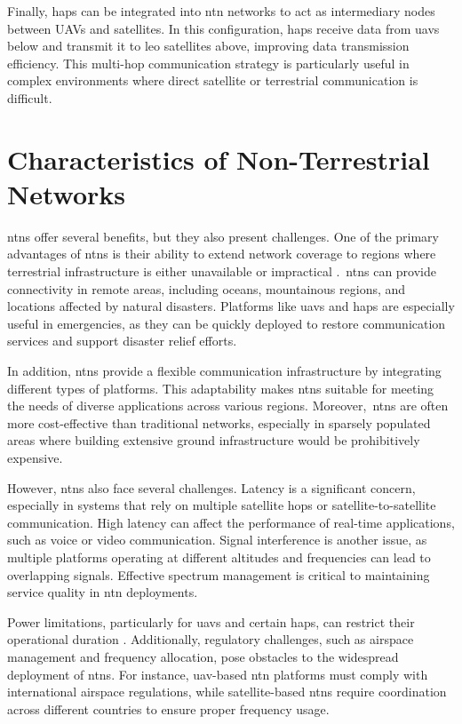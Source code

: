 Finally, \glspl{hap} can be integrated into \gls{ntn} networks to act as intermediary nodes between UAVs and satellites. In this configuration, \glspl{hap} receive data from \glspl{uav} below and transmit it to \gls{leo} satellites above, improving data transmission efficiency. This multi-hop communication strategy is particularly useful in complex environments where direct satellite or terrestrial communication is difficult.

\section{Characteristics of Non-Terrestrial Networks}\label{sec:characteristics_of_non_terrestrial_networks}

\glspl{ntn} offer several benefits, but they also present challenges. One of the primary advantages of \glspl{ntn} is their ability to extend network coverage to regions where terrestrial infrastructure is either unavailable or impractical \autocite{evolution_ntn_from_5g_6g_survey}.\ \glspl{ntn} can provide connectivity in remote areas, including oceans, mountainous regions, and locations affected by natural disasters. Platforms like \glspl{uav} and \glspl{hap} are especially useful in emergencies, as they can be quickly deployed to restore communication services and support disaster relief efforts.

In addition, \glspl{ntn} provide a flexible communication infrastructure by integrating different types of platforms. This adaptability makes \glspl{ntn} suitable for meeting the needs of diverse applications across various regions. Moreover,\ \glspl{ntn} are often more cost-effective than traditional networks, especially in sparsely populated areas where building extensive ground infrastructure would be prohibitively expensive.

However, \glspl{ntn} also face several challenges. Latency is a significant concern, especially in systems that rely on multiple satellite hops or satellite-to-satellite communication. High latency can affect the performance of real-time applications, such as voice or video communication. Signal interference is another issue, as multiple platforms operating at different altitudes and frequencies can lead to overlapping signals. Effective spectrum management is critical to maintaining service quality in \gls{ntn} deployments.

Power limitations, particularly for \glspl{uav} and certain \glspl{hap}, can restrict their operational duration \autocite{power_efficiency_uav}. Additionally, regulatory challenges, such as airspace management and frequency allocation, pose obstacles to the widespread deployment of \glspl{ntn}. For instance, \gls{uav}-based \gls{ntn} platforms must comply with international airspace regulations, while satellite-based \glspl{ntn} require coordination across different countries to ensure proper frequency usage.


